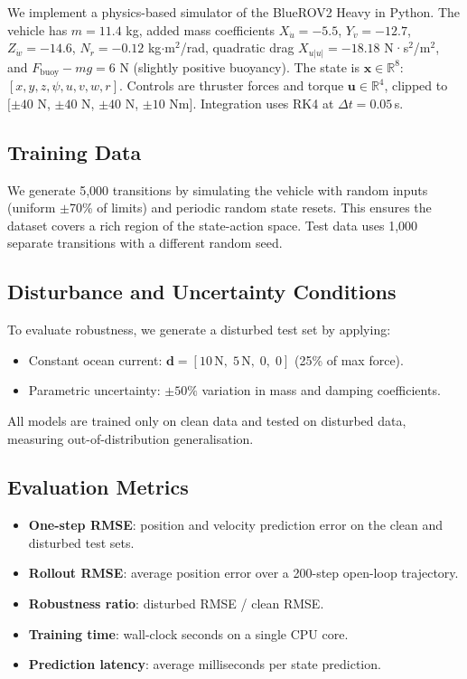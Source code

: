 \documentclass[conference]{IEEEtran}
\newcommand{\vx}{\mathbf{x}}
\newcommand{\vu}{\mathbf{u}}
\newcommand{\Rn}[1]{\mathbb{R}^{#1}}
\begin{document}
We implement a physics-based simulator of the BlueROV2 Heavy in Python.
The vehicle has $m = 11.4$ kg, added mass coefficients $X_{\dot{u}} = -5.5$,
$Y_{\dot{v}} = -12.7$, $Z_{\dot{w}} = -14.6$, $N_{\dot{r}} = -0.12$
kg$\cdot$m$^2$/rad, quadratic drag $X_{u|u|} = -18.18$ N·s$^2$/m$^2$,
and $F_{\text{buoy}} - mg = 6$ N (slightly positive buoyancy).
The state is $\vx \in \Rn{8}$: $[x,y,z,\psi,u,v,w,r]$.
Controls are thruster forces and torque
$\vu \in \Rn{4}$, clipped to $[\pm40$ N, $\pm40$ N, $\pm40$ N, $\pm10$ Nm].
Integration uses RK4 at $\Delta t = 0.05$\,s.

\subsection{Training Data}

We generate 5{,}000 transitions by simulating the vehicle with random inputs
(uniform $\pm$70\% of limits) and periodic random state resets. This ensures
the dataset covers a rich region of the state-action space. Test data uses
1{,}000 separate transitions with a different random seed.

\subsection{Disturbance and Uncertainty Conditions}

To evaluate robustness, we generate a disturbed test set by applying:
\begin{itemize}
  \item Constant ocean current: $\mathbf{d} = [10\,\text{N},\; 5\,\text{N},\; 0,\; 0]$
        (25\% of max force).
  \item Parametric uncertainty: $\pm 50\%$ variation in mass and damping
        coefficients.
\end{itemize}
All models are trained only on clean data and tested on disturbed data,
measuring out-of-distribution generalisation.

\subsection{Evaluation Metrics}

\begin{itemize}
  \item \textbf{One-step RMSE}: position and velocity prediction error
        on the clean and disturbed test sets.
  \item \textbf{Rollout RMSE}: average position error over a 200-step
        open-loop trajectory.
  \item \textbf{Robustness ratio}: disturbed RMSE / clean RMSE.
  \item \textbf{Training time}: wall-clock seconds on a single CPU core.
  \item \textbf{Prediction latency}: average milliseconds per state prediction.
\end{itemize}
\end{document}
